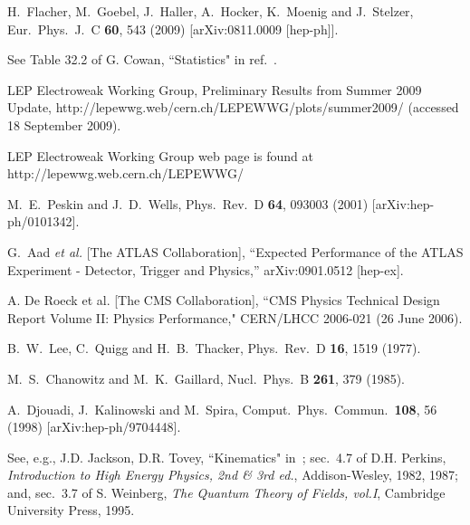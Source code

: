 \documentclass[12pt]{article}
\begin{document}
\begin{thebibliography}{9}
  H.~Flacher, M.~Goebel, J.~Haller, A.~Hocker, K.~Moenig and J.~Stelzer,
  Eur.\ Phys.\ J.\  C {\bf 60}, 543 (2009)
  [arXiv:0811.0009 [hep-ph]].
  
See Table 32.2 of  G. Cowan, ``Statistics" in ref.~\cite{Amsler:2008zzb}.


LEP Electroweak Working Group, Preliminary Results from Summer 2009 Update,
http://lepewwg.web/cern.ch/LEPEWWG/plots/summer2009/ (accessed 18 September 2009).


LEP Electroweak Working Group web page is found at http://lepewwg.web.cern.ch/LEPEWWG/


  M.~E.~Peskin and J.~D.~Wells,
  Phys.\ Rev.\  D {\bf 64}, 093003 (2001)
  [arXiv:hep-ph/0101342].


  G.~Aad {\it et al.}  [The ATLAS Collaboration],
  ``Expected Performance of the ATLAS Experiment - Detector, Trigger and
  Physics,''
  arXiv:0901.0512 [hep-ex].

A. De Roeck et al. [The CMS Collaboration], 
``CMS Physics Technical Design Report Volume II: Physics Performance,"
CERN/LHCC 2006-021 (26 June 2006).

  B.~W.~Lee, C.~Quigg and H.~B.~Thacker,
  Phys.\ Rev.\  D {\bf 16}, 1519 (1977).

  M.~S.~Chanowitz and M.~K.~Gaillard,
  Nucl.\ Phys.\  B {\bf 261}, 379 (1985).

  A.~Djouadi, J.~Kalinowski and M.~Spira,
  Comput.\ Phys.\ Commun.\  {\bf 108}, 56 (1998)
  [arXiv:hep-ph/9704448].


See, e.g., J.D. Jackson, D.R. Tovey, ``Kinematics" in~\cite{Amsler:2008zzb}; sec.\ 4.7 of
D.H. Perkins, {\it Introduction to High Energy Physics, 2nd \& 3rd ed.}, Addison-Wesley, 1982, 1987; and,  sec.\ 3.7 of S. Weinberg, {\it The Quantum Theory of Fields, vol.I}, Cambridge University Press, 1995.



\end{thebibliography}
\end{document}
